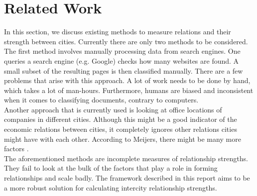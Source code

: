\section{Related Work}
In this section, we discuss existing methods to measure relations and their strength between cities. Currently there are only two methods to be considered. \\

The first method involves manually processing data from search engines. One queries a search engine (e.g. Google) checks how many websites are found. A small subset of the resulting pages is then classified manually. There are a few problems that arise with this approach. A lot of work needs to be done by hand, which takes a lot of man-hours. Furthermore, humans are biased and inconsistent when it comes to classifying documents, contrary to computers. \\

Another approach that is currently used is looking at office locations of companies in different cities. Although this might be a good indicator of the economic relations between cities, it completely ignores other relations cities might have with each other. According to Meijers, there might be many more factors \cite{meijers2007synergy}.\\

The aforementioned methods are incomplete measures of relationship strengths. They fail to look at the bulk of the factors that play a role in forming relationships and scale badly. The framework described in this report aims to be a more robust solution for calculating intercity relationship strengths.
